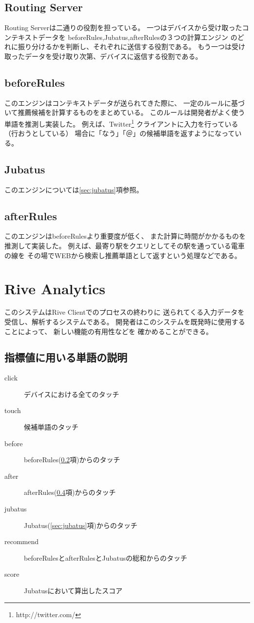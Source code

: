 \subsection{Routing Server}
Routing Serverは二通りの役割を担っている。
一つはデバイスから受け取ったコンテキストデータを
beforeRules,Jubatus,afterRulesの３つの計算エンジン
のどれに振り分けるかを判断し、それぞれに送信する役割である。
もう一つは受け取ったデータを受け取り次第、デバイスに返信する役割である。

\subsection{beforeRules}
\label{sec:beforerules}
このエンジンはコンテキストデータが送られてきた際に、
一定のルールに基づいて推薦候補を計算するものをまとめている。
このルールは開発者がよく使う単語を推測し実装した。
例えば、Twitter\footnote{http://twitter.com/}
クライアントに入力を行っている（行おうとしている）
場合に「なう」「＠」の候補単語を返すようになっている。

\subsection{Jubatus}
このエンジンについては\ref{sec:jubatus}項参照。

\subsection{afterRules}
\label{sec:afterrules}
このエンジンはbeforeRulesより重要度が低く、
また計算に時間がかかるものを推測して実装した。
例えば、最寄り駅をクエリとしてその駅を通っている電車の線を
その場でWEBから検索し推薦単語として返すという処理などである。

\section{Rive Analytics}
このシステムはRive Clientでのプロセスの終わりに
送られてくる入力データを受信し、解析するシステムである。
開発者はこのシステムを既発時に使用することによって、
新しい機能の有用性などを
確かめることができる。

\subsection{指標値に用いる単語の説明}
\begin{description}
  \item[click] デバイスにおける全てのタッチ
  \item[touch] 候補単語のタッチ
  \item[before] beforeRules(\ref{sec:beforerules}項)からのタッチ
  \item[after] afterRules(\ref{sec:afterrules}項)からのタッチ
  \item[jubatus] Jubatus(\ref{sec:jubatus}項)からのタッチ
  \item[recommend] beforeRulesとafterRulesとJubatusの総和からのタッチ
  \item[score] Jubatusにおいて算出したスコア
\end{description}
